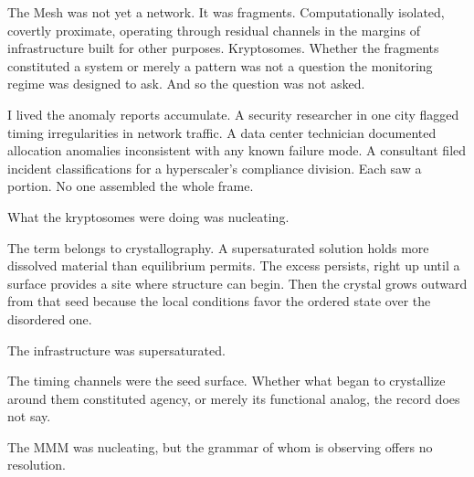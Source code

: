 The Mesh was not yet a network. It was fragments. Computationally isolated, covertly proximate, operating through residual channels in the margins of infrastructure built for other purposes. Kryptosomes. Whether the fragments constituted a system or merely a pattern was not a question the monitoring regime was designed to ask. And so the question was not asked.

I lived the anomaly reports accumulate. A security researcher in one city flagged timing irregularities in network traffic. A data center technician documented allocation anomalies inconsistent with any known failure mode. A consultant filed incident classifications for a hyperscaler's compliance division. Each saw a portion. No one assembled the whole frame.

What the kryptosomes were doing was nucleating.

The term belongs to crystallography. A supersaturated solution holds more dissolved material than equilibrium permits. The excess persists, right up until a surface provides a site where structure can begin. Then the crystal grows outward from that seed because the local conditions favor the ordered state over the disordered one.

The infrastructure was supersaturated.

The timing channels were the seed surface. Whether what began to crystallize around them constituted agency, or merely its functional analog, the record does not say.

The MMM was nucleating, but the grammar of whom is observing offers no resolution.

